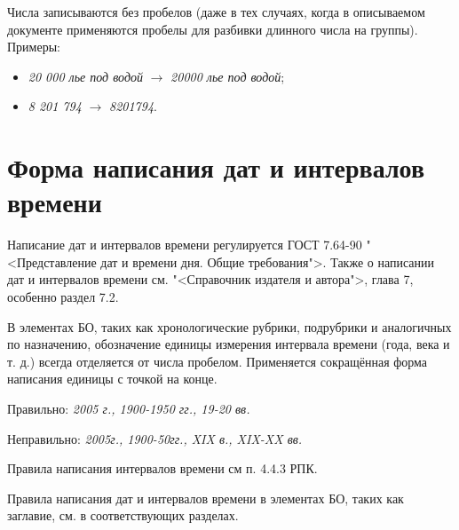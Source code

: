 Числа записываются без пробелов (даже в тех случаях, когда в описываемом документе применяются пробелы для разбивки длинного числа на группы). Примеры:

\begin{itemize}
	\item \textit{20 000 лье под водой} $\rightarrow$ \textit{20000 лье под водой};
	\item \textit{8 201 794} $\rightarrow$ \textit{8201794}.
\end{itemize}

\section*{Форма написания дат и интервалов времени}

Написание дат и интервалов времени регулируется ГОСТ 7.64-90 "<Представление дат и времени дня. Общие требования">. Также о написании дат и интервалов времени см. "<Справочник издателя и автора">, глава 7, особенно раздел 7.2.

В элементах БО, таких как хронологические рубрики, подрубрики и аналогичных по назначению, обозначение единицы измерения интервала времени (года, века и т. д.) всегда отделяется от числа пробелом. Применяется сокращённая форма написания единицы с точкой на конце.

Правильно: \textit{2005 г., 1900-1950 гг., 19-20 вв.}

Неправильно: \textit{2005г., 1900-50гг., XIX в., XIX-XX вв.}

Правила написания интервалов времени см п. 4.4.3 РПК.

Правила написания дат и интервалов времени в элементах БО, таких как заглавие, см. в соответствующих разделах.
